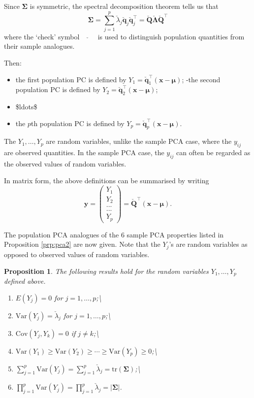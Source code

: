 \documentclass[]{book}
\providecommand{\tightlist}{%
  \setlength{\itemsep}{0pt}\setlength{\parskip}{0pt}}
\newtheorem{proposition}{Proposition}[chapter]
\theoremstyle{definition}
\theoremstyle{definition}
\theoremstyle{definition}
\theoremstyle{remark}
\begin{document}
Since \(\pmb \Sigma\) is symmetric, the spectral decomposition theorem tells us that
\[
{\pmb \Sigma}=\sum_{j=1}^p \check{\lambda}_j \check{\boldsymbol q}_j \check{\boldsymbol q}_j^\top=\check{\boldsymbol Q} \check{\boldsymbol \Lambda}\check{\boldsymbol Q}^\top
\]
where the `check' symbol \(\quad \check{} \quad\) is used to distinguish population quantities from their sample analogues.

Then:

\begin{itemize}
\tightlist
\item
  the first population PC is defined by \(Y_1=\check{\boldsymbol q}_1^\top (\boldsymbol x-{\pmb \mu})\);
  -the second population PC is defined by \(Y_2=\check{\boldsymbol q}_2^\top (\boldsymbol x-{\pmb \mu})\);
\item
  \$ldots\$
\item
  the \(p\)th population PC is defined by \(Y_p=\check{\boldsymbol q}_p^\top (\boldsymbol x-{\pmb \mu})\).
\end{itemize}

The \(Y_1, \ldots , Y_p\) are random variables, unlike the sample PCA case, where the \(y_{ij}\) are observed quantities.
In the sample PCA case, the \(y_{ij}\) can often be regarded as the observed values of random variables.

In matrix form, the above definitions can be summarised by writing
\[
\boldsymbol y=\begin{pmatrix} Y_1 \\ Y_2 \\ ... \\...\\Y_p   \end{pmatrix} = \check{\boldsymbol Q}^\top (\boldsymbol x-{\pmb \mu}).
\]

The population PCA analogues of the 6 sample PCA properties listed in Proposition \ref{prp:pca2} are now given. Note that the
\(Y_j\)'s are random variables as opposed to observed values of random variables.

\begin{proposition}
\protect\hypertarget{prp:pca3}{}{\label{prp:pca3} }The following results hold for the random variables \(Y_1, \ldots , Y_p\) defined above.

\begin{enumerate}
\def\labelenumi{\arabic{enumi}.}
\item
  \(E(Y_j)=0\) for \(j=1, \ldots , p\);\textbackslash{}
\item
  \(\text{Var}(Y_j)=\check{\lambda}_j\) for \(j=1,\ldots, p\);\textbackslash{}
\item
  \(\text{Cov}(Y_j,Y_k)=0\) if \(j \neq k\);\textbackslash{}
\item
  \(\text{Var}(Y_1) \geq \text{Var}(Y_2) \geq \cdots \geq \text{Var}(Y_p) \geq 0\);\textbackslash{}
\item
  \(\sum_{j=1}^p \text{Var}(Y_j)=\sum_{j=1}^p \check{\lambda}_j=\text{tr}(\boldsymbol \Sigma)\);\textbackslash{}
\item
  \(\prod_{j=1}^p \text{Var}(Y_j)=\prod_{j=1}^p \check{\lambda}_j=\vert \boldsymbol \Sigma\vert\).
\end{enumerate}
\end{proposition}
\end{document}
